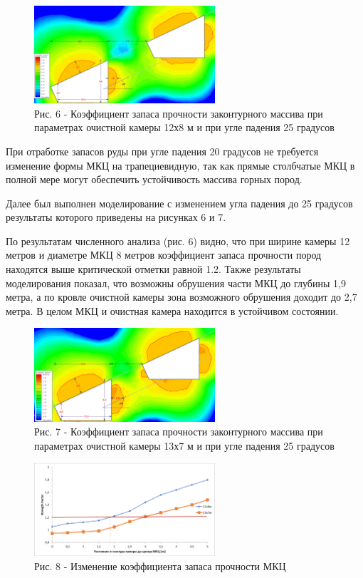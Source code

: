 \begin{figure}[H]
	\centering
	\includegraphics[width=0.6\textwidth]{assets/286}
	\caption*{Рис. 6 - Коэффициент запаса прочности законтурного массива при
параметрах очистной камеры 12х8 м и при угле падения 25 градусов}
\end{figure}

\begin{multicols}{2}
При отработке запасов руды при угле падения 20 градусов не требуется
изменение формы МКЦ на трапециевидную, так как прямые столбчатые МКЦ в
полной мере могут обеспечить устойчивость массива горных пород.

Далее был выполнен моделирование с изменением угла падения до 25
градусов результаты которого приведены на рисунках 6 и 7.

По результатам численного анализа (рис. 6) видно, что при ширине камеры
12 метров и диаметре МКЦ 8 метров коэффициент запаса прочности пород
находятся выше критической отметки равной 1.2. Также результаты
моделирования показал, что возможны обрушения части МКЦ до глубины 1,9
метра, а по кровле очистной камеры зона возможного обрушения доходит до
2,7 метра. В целом МКЦ и очистная камера находится в устойчивом
состоянии.
\end{multicols}

\begin{figure}[H]
	\centering
	\includegraphics[width=0.6\textwidth]{assets/287}
	\caption*{Рис. 7 - Коэффициент запаса прочности законтурного массива при
параметрах очистной камеры 13х7 м и при угле падения 25 градусов}
\end{figure}

\begin{figure}[H]
	\centering
	\includegraphics[width=0.6\textwidth]{assets/288}
	\caption*{Рис. 8 - Изменение коэффициента запаса прочности МКЦ}
\end{figure}

